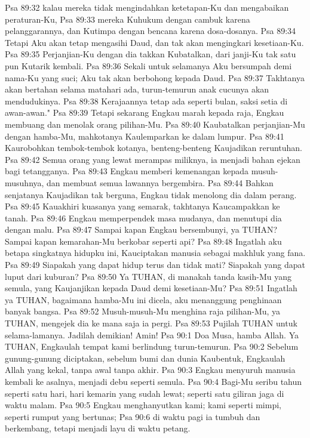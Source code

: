 Psa 89:32  kalau mereka tidak mengindahkan ketetapan-Ku dan mengabaikan peraturan-Ku,
Psa 89:33  mereka Kuhukum dengan cambuk karena pelanggarannya, dan Kutimpa dengan bencana karena dosa-dosanya.
Psa 89:34  Tetapi Aku akan tetap mengasihi Daud, dan tak akan mengingkari kesetiaan-Ku.
Psa 89:35  Perjanjian-Ku dengan dia takkan Kubatalkan, dari janji-Ku tak satu pun Kutarik kembali.
Psa 89:36  Sekali untuk selamanya Aku bersumpah demi nama-Ku yang suci; Aku tak akan berbohong kepada Daud.
Psa 89:37  Takhtanya akan bertahan selama matahari ada, turun-temurun anak cucunya akan mendudukinya.
Psa 89:38  Kerajaannya tetap ada seperti bulan, saksi setia di awan-awan."
Psa 89:39  Tetapi sekarang Engkau marah kepada raja, Engkau membuang dan menolak orang pilihan-Mu.
Psa 89:40  Kaubatalkan perjanjian-Mu dengan hamba-Mu, mahkotanya Kaulemparkan ke dalam lumpur.
Psa 89:41  Kaurobohkan tembok-tembok kotanya, benteng-benteng Kaujadikan reruntuhan.
Psa 89:42  Semua orang yang lewat merampas miliknya, ia menjadi bahan ejekan bagi tetangganya.
Psa 89:43  Engkau memberi kemenangan kepada musuh-musuhnya, dan membuat semua lawannya bergembira.
Psa 89:44  Bahkan senjatanya Kaujadikan tak berguna, Engkau tidak menolong dia dalam perang.
Psa 89:45  Kauakhiri kuasanya yang semarak, takhtanya Kaucampakkan ke tanah.
Psa 89:46  Engkau memperpendek masa mudanya, dan menutupi dia dengan malu.
Psa 89:47  Sampai kapan Engkau bersembunyi, ya TUHAN? Sampai kapan kemarahan-Mu berkobar seperti api?
Psa 89:48  Ingatlah aku betapa singkatnya hidupku ini, Kauciptakan manusia sebagai makhluk yang fana.
Psa 89:49  Siapakah yang dapat hidup terus dan tidak mati? Siapakah yang dapat luput dari kuburan?
Psa 89:50  Ya TUHAN, di manakah tanda kasih-Mu yang semula, yang Kaujanjikan kepada Daud demi kesetiaan-Mu?
Psa 89:51  Ingatlah ya TUHAN, bagaimana hamba-Mu ini dicela, aku menanggung penghinaan banyak bangsa.
Psa 89:52  Musuh-musuh-Mu menghina raja pilihan-Mu, ya TUHAN, mengejek dia ke mana saja ia pergi.
Psa 89:53  Pujilah TUHAN untuk selama-lamanya. Jadilah demikian! Amin!
Psa 90:1  Doa Musa, hamba Allah. Ya TUHAN, Engkaulah tempat kami berlindung turun-temurun.
Psa 90:2  Sebelum gunung-gunung diciptakan, sebelum bumi dan dunia Kaubentuk, Engkaulah Allah yang kekal, tanpa awal tanpa akhir.
Psa 90:3  Engkau menyuruh manusia kembali ke asalnya, menjadi debu seperti semula.
Psa 90:4  Bagi-Mu seribu tahun seperti satu hari, hari kemarin yang sudah lewat; seperti satu giliran jaga di waktu malam.
Psa 90:5  Engkau menghanyutkan kami; kami seperti mimpi, seperti rumput yang bertunas;
Psa 90:6  di waktu pagi ia tumbuh dan berkembang, tetapi menjadi layu di waktu petang.
